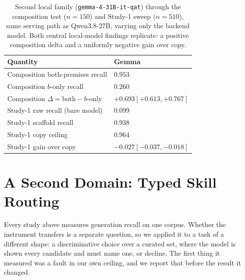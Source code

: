 \documentclass[10pt,twocolumn]{article}
\begin{document}
\begin{table}[t]\centering\small
\caption{Second local family (\texttt{gemma-4-31B-it-qat}) through the composition test
($n=150$) and Study-1 sweep ($n=510$), same serving path as Qwen3.8-27B, varying only the
backend model. Both central local-model findings replicate: a positive composition delta and a
uniformly negative gain over copy.}
\label{tab:gemma}
\begin{tabular}{@{}p{}l@{}}
\toprule
Quantity & Gemma \\
\midrule
Composition both-premises recall & $0.953$ \\
Composition $b$-only recall       & $0.260$ \\
Composition $\Delta=\text{both}-b\text{-only}$ & $+0.693$\quad$[+0.613,+0.767]$ \\
\midrule
Study-1 raw recall (bare model)   & $0.099$ \\
Study-1 scaffold recall           & $0.938$ \\
Study-1 copy ceiling              & $0.964$ \\
Study-1 gain over copy            & $-0.027$\quad$[-0.037,-0.018]$ \\
\bottomrule
\end{tabular}
\end{table}



\section{A Second Domain: Typed Skill Routing}\label{sec:routing}
Every study above measures generation recall on one corpus. Whether the instrument transfers is a separate question, so we applied it to a task of a different shape: a discriminative choice over a curated set, where the model is shown every candidate and must name one, or decline. The first thing it measured was a fault in our own ceiling, and we report that before the result it changed.
\end{document}
